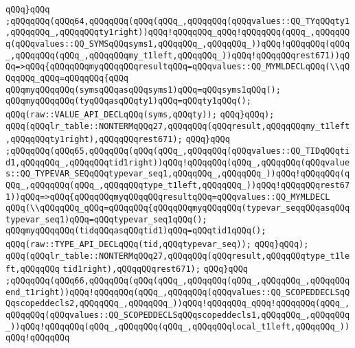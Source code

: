 \verb|qQQq}qQQq|\newline
\verb|;qQQqqQQq(qQQq64,qQQqqQQq(qQQq(qQQq_,qQQqqQQq(qQQqvalues::QQ_TYqQQqty1,qQQqqQQq_,qQQqqQQqty1right))qQQq!qQQqqQQq_qQQq!qQQqqQQq(qQQq_,qQQqqQQq(qQQqvalues::QQ_SYMSqQQqsyms1,qQQqqQQq_,qQQqqQQq_))qQQq!qQQqqQQq(qQQq_,qQQqqQQq(qQQq_,qQQqqQQqmy_t1left,qQQqqQQq_))qQQq!qQQqqQQqrest671))qQQq=>qQQq{qQQqqQQqmyqQQqqQQqresultqQQq=qQQqvalues::QQ_MYMLDECLqQQq(\\qQQqqQQq_qQQq=qQQqqQQq{qQQq|\newline
\verb|qQQqmyqQQqqQQq(symsqQQqasqQQqsyms1)qQQq=qQQqsyms1qQQq();|\newline
\verb|qQQqmyqQQqqQQq(tyqQQqasqQQqty1)qQQq=qQQqty1qQQq();|\newline
\verb|qQQq(raw::VALUE_API_DECLqQQq(syms,qQQqty));|\newline
\verb|qQQq}qQQq);|\newline
\verb|qQQq(qQQqlr_table::NONTERMqQQq27,qQQqqQQq(qQQqresult,qQQqqQQqmy_t1left,qQQqqQQqty1right),qQQqqQQqrest671);|\newline
\verb|qQQq}qQQq|\newline
\verb|;qQQqqQQq(qQQq65,qQQqqQQq(qQQq(qQQq_,qQQqqQQq(qQQqvalues::QQ_TIDqQQqtid1,qQQqqQQq_,qQQqqQQqtid1right))qQQq!qQQqqQQq(qQQq_,qQQqqQQq(qQQqvalues::QQ_TYPEVAR_SEQqQQqtypevar_seq1,qQQqqQQq_,qQQqqQQq_))qQQq!qQQqqQQq(qQQq_,qQQqqQQq(qQQq_,qQQqqQQqtype_t1left,qQQqqQQq_))qQQq!qQQqqQQqrest671))qQQq=>qQQq{qQQqqQQqmyqQQqqQQqresultqQQq=qQQqvalues::QQ_MYMLDECL|\newline
\verb|qQQq(\\qQQqqQQq_qQQq=qQQqqQQq{qQQqqQQqmyqQQqqQQq(typevar_seqqQQqasqQQqtypevar_seq1)qQQq=qQQqtypevar_seq1qQQq();|\newline
\verb|qQQqmyqQQqqQQq(tidqQQqasqQQqtid1)qQQq=qQQqtid1qQQq();|\newline
\verb|qQQq(raw::TYPE_API_DECLqQQq(tid,qQQqtypevar_seq));|\newline
\verb|qQQq}qQQq);|\newline
\verb|qQQq(qQQqlr_table::NONTERMqQQq27,qQQqqQQq(qQQqresult,qQQqqQQqtype_t1left,qQQqqQQq|\newline
\verb|tid1right),qQQqqQQqrest671);|\newline
\verb|qQQq}qQQq|\newline
\verb|;qQQqqQQq(qQQq66,qQQqqQQq(qQQq(qQQq_,qQQqqQQq(qQQq_,qQQqqQQq_,qQQqqQQqend_t1right))qQQq!qQQqqQQq(qQQq_,qQQqqQQq(qQQqvalues::QQ_SCOPEDDECLSqQQqscopeddecls2,qQQqqQQq_,qQQqqQQq_))qQQq!qQQqqQQq_qQQq!qQQqqQQq(qQQq_,qQQqqQQq(qQQqvalues::QQ_SCOPEDDECLSqQQqscopeddecls1,qQQqqQQq_,qQQqqQQq_))qQQq!qQQqqQQq(qQQq_,qQQqqQQq(qQQq_,qQQqqQQqlocal_t1left,qQQqqQQq_))qQQq!qQQqqQQq|\newline
